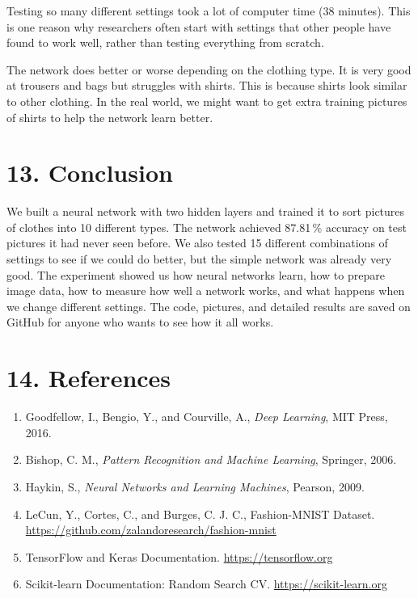 \documentclass[11pt]{article}
\begin{document}
Testing so many different settings took a lot of computer time (38 minutes). This is one reason why researchers often start with settings that other people have found to work well, rather than testing everything from scratch.

The network does better or worse depending on the clothing type. It is very good at trousers and bags but struggles with shirts. This is because shirts look similar to other clothing. In the real world, we might want to get extra training pictures of shirts to help the network learn better.

\section*{13. Conclusion}

We built a neural network with two hidden layers and trained it to sort pictures of clothes into 10 different types. The network achieved 87.81\,\% accuracy on test pictures it had never seen before. We also tested 15 different combinations of settings to see if we could do better, but the simple network was already very good. The experiment showed us how neural networks learn, how to prepare image data, how to measure how well a network works, and what happens when we change different settings. The code, pictures, and detailed results are saved on GitHub for anyone who wants to see how it all works.

\section*{14. References}

\begin{enumerate}
\item Goodfellow, I., Bengio, Y., and Courville, A., \emph{Deep Learning}, MIT Press, 2016.
\item Bishop, C. M., \emph{Pattern Recognition and Machine Learning}, Springer, 2006.
\item Haykin, S., \emph{Neural Networks and Learning Machines}, Pearson, 2009.
\item LeCun, Y., Cortes, C., and Burges, C. J. C., Fashion-MNIST Dataset. \url{https://github.com/zalandoresearch/fashion-mnist}
\item TensorFlow and Keras Documentation. \url{https://tensorflow.org}
\item Scikit-learn Documentation: Random Search CV. \url{https://scikit-learn.org}

\end{enumerate}
\end{document}
